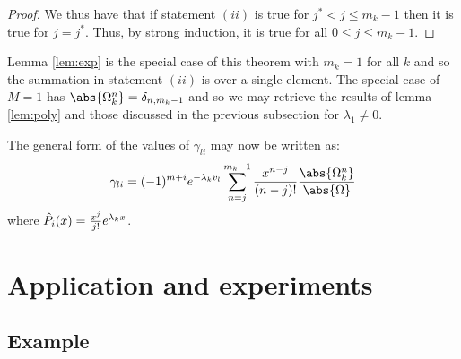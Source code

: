 \documentclass{article}
\begin{document}
\begin{proof}
We thus have that if statement $(ii)$ is true for $j^* < j \leq m_k-1$ then it is true for $j=j^*$.
Thus, by strong induction, it is true for all $0 \leq j \leq m_k-1$.
\end{proof}

Lemma \ref{lem:exp} is the special case of this theorem with $m_k = 1$ for all $k$ and so the summation in statement $(ii)$ is over a single element.
The special case of $M=1$ has $\abs{\Omega_k^n} = \delta_{n,m_k-1}$ and so we may retrieve the results of lemma \ref{lem:poly} and those discussed in the previous subsection for $\lambda_1 \neq 0$.

The general form of the values of $\gamma_{li}$ may now be written as:
\begin{equation*}
\gamma_{li} = (-1)^{m+i} e^{-\lambda_k v_l} \sum_{n=j}^{m_k-1} \poly{n-j} \frac{\abs{\Omega_k^n}}{\abs{\Omega}}
\end{equation*}
where $\hat{P}_i(x) = \frac{x^j}{j!} e^{\lambda_k x}$.

\section{Application and experiments}

\subsection{Example}
\end{document}
